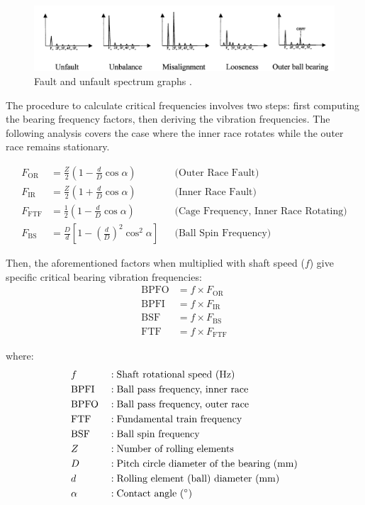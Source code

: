 {{\begin{figure}[h]
\centering
\includegraphics[width=\linewidth]{figures/FaultsAndUnfaults.png}
\caption{Fault and unfault spectrum graphs \cite{Betta2002}.}
\label{fig:faultsunfaults}
\end{figure}

The procedure to calculate critical frequencies involves two steps: first computing the bearing frequency factors, then deriving the vibration frequencies. The following analysis covers the case where the inner race rotates while the outer race remains stationary.

\begin{align}
	F_{\text{OR}} &= \frac{Z}{2} \left(1 - \frac{d}{D} \cos\alpha\right) 
	&&\text{(Outer Race Fault)} \label{eq:OR} \\
	F_{\text{IR}} &= \frac{Z}{2} \left(1 + \frac{d}{D} \cos\alpha\right) 
	&&\text{(Inner Race Fault)} \label{eq:IR} \\
	F_{\text{FTF}} &= \frac{1}{2} \left(1 - \frac{d}{D} \cos\alpha\right) 
	&&\text{(Cage Frequency, Inner Race Rotating)} \label{eq:FT} \\
	F_{\text{BS}} &= \frac{D}{d} \left[1 - \left(\frac{d}{D}\right)^2 \cos^2\alpha\right] 
	&&\text{(Ball Spin Frequency)} \label{eq:BS}
\end{align}

Then, the aforementioned factors when multiplied with shaft speed ($f$) give specific critical bearing vibration frequencies:
\begin{align}
	\text{BPFO} &= f \times F_{\text{OR}} \label{eq:BPFO} \\
	\text{BPFI} &= f \times F_{\text{IR}} \label{eq:BPFI} \\
	\text{BSF}  &= f \times F_{\text{BS}} \label{eq:BSF} \\
	\text{FTF}  &= f \times F_{\text{FTF}} \label{eq:FTF}
\end{align}

where:
\begin{align*}
	&f    &&: \text{Shaft rotational speed (\si{\hertz})} \\
	&\text{BPFI} &&: \text{Ball pass frequency, inner race} \\
	&\text{BPFO} &&: \text{Ball pass frequency, outer race} \\
	&\text{FTF}  &&: \text{Fundamental train frequency} \\
	&\text{BSF}  &&: \text{Ball spin frequency} \\
	&Z    &&: \text{Number of rolling elements} \\
	&D    &&: \text{Pitch circle diameter of the bearing (\si{\milli\meter})} \\
	&d    &&: \text{Rolling element (ball) diameter (\si{\milli\meter})} \\
	&\alpha &&: \text{Contact angle (\si{\degree})} \\
\end{align*}

}}
